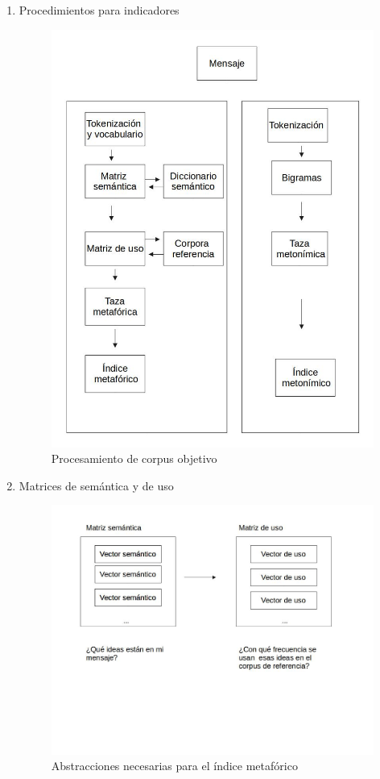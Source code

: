 \documentclass[twoside]{article}
\begin{document}
\begin{enumerate}
\item Procedimientos para indicadores
\label{sec:org15a96d9}
\begin{figure}[htbp]
\centering
\includegraphics[width=.9\linewidth]{./assets/metodologia.jpg}
\caption{Procesamiento de corpus objetivo}
\end{figure}   

\item Matrices de semántica y de uso
\label{sec:org0525fc1}

\begin{figure}[htbp]
\centering
\includegraphics[width=.9\linewidth]{./assets/matrices.jpg}
\caption{Abstracciones necesarias para el índice metafórico}
\end{figure}


\end{enumerate}
\end{document}
